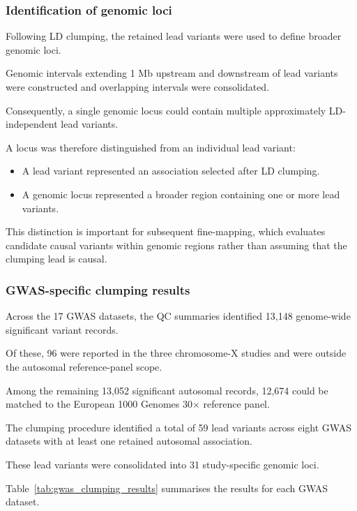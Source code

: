\documentclass[11pt,a4paper]{article}
\begin{document}
\subsubsection{Identification of genomic loci}

Following LD clumping, the retained lead variants
were used to define broader genomic loci.

Genomic intervals extending 1 Mb upstream and
downstream of lead variants were constructed
and overlapping intervals were consolidated.

Consequently, a single genomic locus could
contain multiple approximately LD-independent
lead variants.

A locus was therefore distinguished from an
individual lead variant:

\begin{itemize}
    \item A lead variant represented an association
    selected after LD clumping.
    \item A genomic locus represented a broader
    region containing one or more lead variants.
\end{itemize}

This distinction is important for subsequent
fine-mapping, which evaluates candidate causal
variants within genomic regions rather than
assuming that the clumping lead is causal.

\subsubsection{GWAS-specific clumping results}

Across the 17 GWAS datasets, the QC summaries
identified 13,148 genome-wide significant
variant records.

Of these, 96 were reported in the three
chromosome-X studies and were outside the
autosomal reference-panel scope.

Among the remaining 13,052 significant
autosomal records, 12,674 could be matched
to the European 1000 Genomes 30$\times$
reference panel.

The clumping procedure identified a total of
59 lead variants across eight GWAS datasets
with at least one retained autosomal association.

These lead variants were consolidated into
31 study-specific genomic loci.

Table~\ref{tab:gwas_clumping_results} summarises
the results for each GWAS dataset.

\begingroup
\scriptsize
\setlength{\tabcolsep}{3pt}
\end{document}
